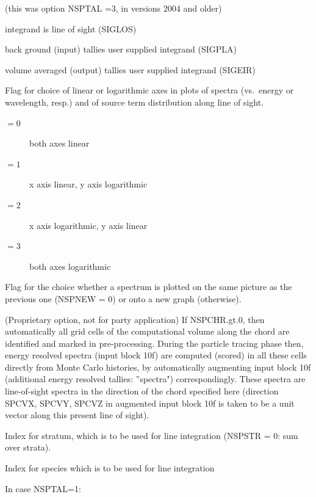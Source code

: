 \begin{description}
\begin{description}
                (this was option NSPTAL =3, in versions 2004 and older)
          \item[$= 11$] integrand is line of sight (SIGLOS)
          \item[$= 12$] back ground (input) tallies
                user supplied integrand (SIGPLA)
          \item[$= 13$] volume averaged (output) tallies
                user supplied integrand (SIGEIR)
        \end{description}
  \item[NSPSCL] Flag for choice of linear or logarithmic axes in plots of spectra
        (vs.\ energy or wavelength, resp.) and of source term distribution along
        line of sight.
        \begin{description}
          \item[$= 0$] both axes linear
          \item[$= 1$] x axis linear, y axis logarithmic
          \item[$= 2$] x axis logarithmic, y axis linear
          \item[$= 3$] both axes
                logarithmic
        \end{description}
  \item[NSPNEW] Flag for the choice whether a
        spectrum is plotted on the same picture as the previous one (NSPNEW = 0) or
        onto a new graph (otherwise).
  \item[NSPCHR] (Proprietary option, not for  party application) If
        NSPCHR.gt.0, then automatically all grid cells of the computational volume
        along the chord are identified and marked in pre-processing.
        During the particle tracing phase then, energy resolved spectra (input block
        10f) are computed (scored) in all these cells directly from Monte Carlo
        histories, by automatically augmenting input block 10f (additional energy
        resolved tallies: ''spectra") correspondingly.
        These spectra are line-of-sight spectra in the direction of the chord specified
        here (direction SPCVX, SPCVY, SPCVZ in augmented input block 10f is taken to be
        a unit vector along this present line of sight).
  \item[NSPSTR] Index for stratum, which is to be used for line integration
        (NSPSTR = 0: sum over strata).
  \item[NSPSPZ] Index for species which is to be used for line integration

        In case NSPTAL=1:


\end{description}
